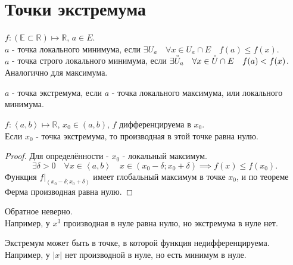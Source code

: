 \documentclass[11pt, oneside]{article}   	%
\begin{document}
    \section{Точки экстремума}
    \begin{definition}
       $f: (\mathbb{E} \subset \mathbb{R}) \mapsto \mathbb{R}$, $a\in E$. \\
       $a$ - точка локального минимума, если $\exists{U_a}\quad \forall{x\in U_a\cap E}\quad f(a) \le f(x)$.\\
       $a$ - точка строго локального минимума, если $\exists{\accentset{\circ}{U}_a}\quad \forall{x\in \accentset{\circ}{U}\cap E}\quad f(a) < f(x)$.
       Аналогично для максимума.\\
    \end{definition}
    \begin{definition}
       $a$ - точка экстремума, если $a$ - точка локального максимума, или локального минимума.
    \end{definition}
    \begin{theorem}
       $f: \left<a, b\right> \mapsto \mathbb{R}$, $x_0\in (a, b)$, $f$ дифференцируема в  $x_0$.\\
       Если $x_0$ - точка экстремума, то производная в этой точке равна нулю.\\
       \begin{proof}
           Для определённости - $x_0$ - локальный максимум.\\
           \[ \exists{\delta > 0}\quad \forall{x\in \left<a, b\right>}\quad x\in (x_0-\delta; x_0+\delta) \implies f(x) \le f(x_0) .\]
           Функция $\left.f\right|_{(x_0-\delta; x_0+\delta)}$ имеет глобальный максимум в точке $x_0$, и по теореме Ферма производная равна нулю.
       \end{proof}
    \end{theorem}
    \begin{tlemma}
        Обратное неверно.\\
        Например, у $x^{3}$ производная в нуле равна нулю, но экстремума в нуле нет.
    \end{tlemma}
    \begin{tlemma}
        Экстремум может быть в точке, в которой функция недифференцируема.
        Например, у $|x|$ нет производной в нуле, но есть минимум в нуле.
    \end{tlemma}
\end{document}
